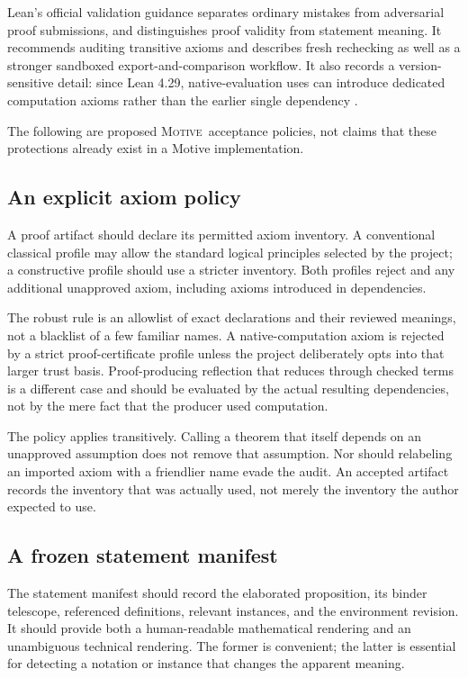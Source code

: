 \documentclass[11pt,a4paper]{article}
\newcommand{\Motive}{\textnormal{\textsc{Motive}}}
\newcommand{\code}[1]{\texttt{\detokenize{#1}}}
\theoremstyle{remark}
\begin{document}
Lean's official validation guidance separates ordinary mistakes from adversarial proof submissions, and distinguishes proof validity from statement meaning. It recommends auditing transitive axioms and describes fresh rechecking as well as a stronger sandboxed export-and-comparison workflow. It also records a version-sensitive detail: since Lean 4.29, native-evaluation uses can introduce dedicated computation axioms rather than the earlier single \code{Lean.trustCompiler} dependency \cite{lean-trust}.

The following are proposed \Motive\ acceptance policies, not claims that these protections already exist in a Motive implementation.

\subsection{An explicit axiom policy}
A proof artifact should declare its permitted axiom inventory. A conventional classical profile may allow the standard logical principles selected by the project; a constructive profile should use a stricter inventory. Both profiles reject \code{sorryAx} and any additional unapproved axiom, including axioms introduced in dependencies.

The robust rule is an allowlist of exact declarations and their reviewed meanings, not a blacklist of a few familiar names. A native-computation axiom is rejected by a strict proof-certificate profile unless the project deliberately opts into that larger trust basis. Proof-producing reflection that reduces through checked terms is a different case and should be evaluated by the actual resulting dependencies, not by the mere fact that the producer used computation.

The policy applies transitively. Calling a theorem that itself depends on an unapproved assumption does not remove that assumption. Nor should relabeling an imported axiom with a friendlier name evade the audit. An accepted artifact records the inventory that was actually used, not merely the inventory the author expected to use.

\subsection{A frozen statement manifest}
The statement manifest should record the elaborated proposition, its binder telescope, referenced definitions, relevant instances, and the environment revision. It should provide both a human-readable mathematical rendering and an unambiguous technical rendering. The former is convenient; the latter is essential for detecting a notation or instance that changes the apparent meaning.
\end{document}
